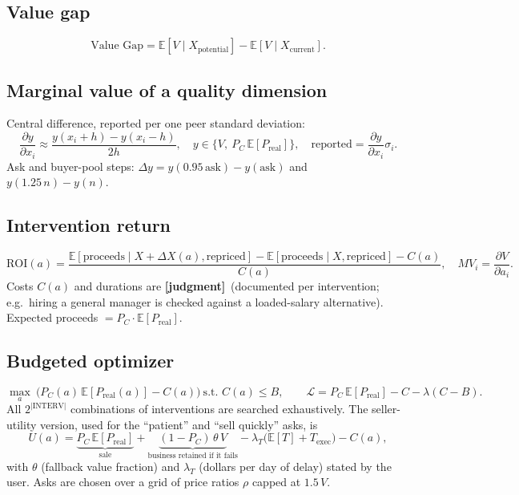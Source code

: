 \documentclass[11pt]{article}
\newcommand{\EV}[1]{\mathbb{E}\!\left[#1\right]}
\newcommand{\jud}{\textbf{[judgment]}}
\begin{document}
\subsection{Value gap}
\begin{equation}
\text{Value Gap}=\EV{V\mid X_{\text{potential}}}-\EV{V\mid X_{\text{current}}}.
\end{equation}
\subsection{Marginal value of a quality dimension}
Central difference, reported per one peer standard deviation:
\begin{equation}
\frac{\partial y}{\partial x_i}\approx\frac{y(x_i+h)-y(x_i-h)}{2h},\quad y\in\{V,\ P_C\,\EV{P_{\text{real}}}\},\quad\text{reported}=\frac{\partial y}{\partial x_i}\sigma_i.
\end{equation}
Ask and buyer-pool steps: $\Delta y=y(0.95\,\text{ask})-y(\text{ask})$ and $y(1.25\,n)-y(n)$.
\subsection{Intervention return}
\begin{equation}
\text{ROI}(a)=\frac{\EV{\text{proceeds}\mid X+\Delta X(a),\text{repriced}}-\EV{\text{proceeds}\mid X,\text{repriced}}-C(a)}{C(a)},\quad MV_i=\frac{\partial V}{\partial a_i}.
\end{equation}
Costs $C(a)$ and durations are \jud\ (documented per intervention; e.g.\ hiring a general manager is checked against a loaded-salary alternative). Expected proceeds $=P_C\cdot\EV{P_{\text{real}}}$.
\subsection{Budgeted optimizer}
\begin{equation}
\max_a\ \Big(P_C(a)\,\EV{P_{\text{real}}(a)}-C(a)\Big)\ \text{s.t. }C(a)\le B,\qquad \mathcal L=P_C\,\EV{P_{\text{real}}}-C-\lambda(C-B).
\end{equation}
All $2^{|\text{INTERV}|}$ combinations of interventions are searched exhaustively. The seller-utility version, used for the ``patient'' and ``sell quickly'' asks, is
\begin{equation}
U(a)=\underbrace{P_C\,\EV{P_{\text{real}}}}_{\text{sale}}+\underbrace{(1-P_C)\,\theta\,V}_{\text{business retained if it fails}}-\lambda_T\big(\EV{T}+T_{\text{exec}}\big)-C(a),
\end{equation}
with $\theta$ (fallback value fraction) and $\lambda_T$ (dollars per day of delay) stated by the user. Asks are chosen over a grid of price ratios $\rho$ capped at $1.5\,V$.
\end{document}
